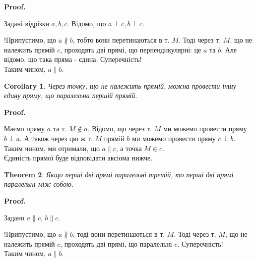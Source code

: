 \documentclass[a4paper, 10pt]{article}
\makeatletter
\theoremstyle{theoremdd}
\newtheorem{theorem}{Theorem}[subsection]
\theoremstyle{theoremdd}
\theoremstyle{theoremdd}
\theoremstyle{theoremdd}
\theoremstyle{theoremdd}
\theoremstyle{theoremdd}
\theoremstyle{theoremdd}
\theoremstyle{theoremdd}
\theoremstyle{theoremdd}
\newtheorem{corollary}[theorem]{Corollary}
\renewenvironment{proof}[1][Proof.\\]{\par
\pushQED{\hfill \qed}%
\normalfont \topsep6\p@\@plus6\p@\relax
\trivlist
\item\relax
{\bfseries
#1\@addpunct{.}}\hspace\labelsep\ignorespaces
}{%
\popQED\endtrivlist\@endpefalse
}
\makeatother
\begin{document}
\begin{proof}
Задані відрізки $a,b,c$. Відомо, що $a \perp c, b \perp c$.\\
\begin{figure}[H]
\centering
{}
\end{figure}
!Припустимо, що $a \not\parallel b$, тобто вони перетинаються в т. $M$. Тоді через т. $M$, що не належить прямій $c$, проходять дві прямі, що перпендикулярні: це $a$ та $b$. Але відомо, що така пряма - єдина. Суперечність!\\
Таким чином, $a \parallel b$.
\end{proof}

\begin{corollary}
Через точку, що не належить прямій, можна провести іншу єдину пряму, що паралельна першій прямій.
\end{corollary}

\begin{proof}
Маємо пряму $a$ та т. $M \not\in a$. Відомо, що через т. $M$ ми можемо провести пряму $b \perp a$. А також через цю ж т. $M$ прямій $b$ ми можемо провести пряму $c \perp b$.\\
Таким чином, ми отримали, що $a \parallel c$, а точка $M \in c$.\\
Єдиність прямої буде відповідати аксіома нижче.
\end{proof}

\begin{theorem}
Якщо перші дві прямі паралельні третій, то перші дві прямі паралельні між собою.
\end{theorem}

\begin{proof}
Задано $a \parallel c$, $b \parallel c$.\\
\begin{figure}[H]
\centering
{}
\end{figure}
!Припустимо, що $a \not\parallel b$, тоді вони перетинаються в т. $M$. Тоді через т. $M$, що не належить прямій $c$, проходять дві прямі, що паралельні $c$. Суперечність!\\
Таким чином, $a \parallel b$.
\end{proof}
\end{document}
